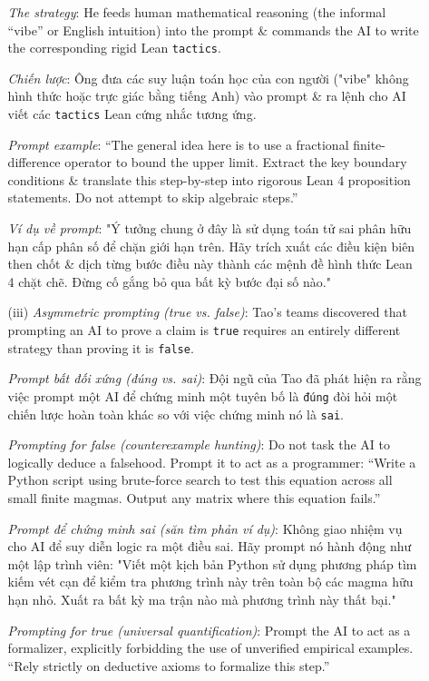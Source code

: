 \documentclass{article}
\begin{document}
\begin{enumerate}
\begin{itemize}
		\textit{The strategy}: He feeds human mathematical reasoning (the informal ``vibe'' or English intuition) into the prompt \& commands the AI to write the corresponding rigid Lean {\tt tactics}.
		
		\textit{Chiến lược}: Ông đưa các suy luận toán học của con người ("vibe" không hình thức hoặc trực giác bằng tiếng Anh) vào prompt \& ra lệnh cho AI viết các {\tt tactics} Lean cứng nhắc tương ứng.
		
		\textit{Prompt example}: ``The general idea here is to use a fractional finite-difference operator to bound the upper limit. Extract the key boundary conditions \& translate this step-by-step into rigorous Lean 4 proposition statements. Do not attempt to skip algebraic steps.''
		
		\textit{Ví dụ về prompt}: "Ý tưởng chung ở đây là sử dụng toán tử sai phân hữu hạn cấp phân số để chặn giới hạn trên. Hãy trích xuất các điều kiện biên then chốt \& dịch từng bước điều này thành các mệnh đề hình thức Lean 4 chặt chẽ. Đừng cố gắng bỏ qua bất kỳ bước đại số nào."
		\item[(iii)] \textit{Asymmetric prompting (true vs. false)}: {\sc Tao}'s teams discovered that prompting an AI to prove a claim is {\tt true} requires an entirely different strategy than proving it is {\tt false}.
		
		\textit{Prompt bất đối xứng (đúng vs. sai)}: Đội ngũ của {\sc Tao} đã phát hiện ra rằng việc prompt một AI để chứng minh một tuyên bố là {\tt đúng} đòi hỏi một chiến lược hoàn toàn khác so với việc chứng minh nó là {\tt sai}.
		
		\textit{Prompting for false (counterexample hunting)}: Do not task the AI to logically deduce a falsehood. Prompt it to act as a programmer: ``Write a Python script using brute-force search to test this equation across all small finite magmas. Output any matrix where this equation fails.''
		
		\textit{Prompt để chứng minh sai (săn tìm phản ví dụ)}: Không giao nhiệm vụ cho AI để suy diễn logic ra một điều sai. Hãy prompt nó hành động như một lập trình viên: "Viết một kịch bản Python sử dụng phương pháp tìm kiếm vét cạn để kiểm tra phương trình này trên toàn bộ các magma hữu hạn nhỏ. Xuất ra bất kỳ ma trận nào mà phương trình này thất bại."
		
		\textit{Prompting for true (universal quantification)}: Prompt the AI to act as a formalizer, explicitly forbidding the use of unverified empirical examples. ``Rely strictly on deductive axioms to formalize this step.''
		

\end{itemize}
\end{enumerate}
\end{document}
